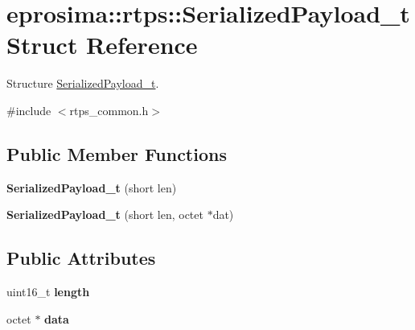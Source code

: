 \hypertarget{structeprosima_1_1rtps_1_1_serialized_payload__t}{\section{eprosima\-:\-:rtps\-:\-:\-Serialized\-Payload\-\_\-t \-Struct \-Reference}
\label{structeprosima_1_1rtps_1_1_serialized_payload__t}
}


\-Structure \hyperlink{structeprosima_1_1rtps_1_1_serialized_payload__t}{\-Serialized\-Payload\-\_\-t}.  




{\ttfamily \#include $<$rtps\-\_\-common.\-h$>$}

\subsection*{\-Public \-Member \-Functions}
\begin{DoxyCompactItemize}
\item 
\hypertarget{structeprosima_1_1rtps_1_1_serialized_payload__t_ae764cdef3036696a60136a3c415dc4d1}{{\bfseries \-Serialized\-Payload\-\_\-t} (short len)}\label{structeprosima_1_1rtps_1_1_serialized_payload__t_ae764cdef3036696a60136a3c415dc4d1}

\item 
\hypertarget{structeprosima_1_1rtps_1_1_serialized_payload__t_a59854fca9500a1aaf42189bdb972950c}{{\bfseries \-Serialized\-Payload\-\_\-t} (short len, octet $\ast$dat)}\label{structeprosima_1_1rtps_1_1_serialized_payload__t_a59854fca9500a1aaf42189bdb972950c}

\end{DoxyCompactItemize}
\subsection*{\-Public \-Attributes}
\begin{DoxyCompactItemize}
\item 
\hypertarget{structeprosima_1_1rtps_1_1_serialized_payload__t_acddf05ab5c3a538ecf352e28fd9ca1db}{uint16\-\_\-t {\bfseries length}}\label{structeprosima_1_1rtps_1_1_serialized_payload__t_acddf05ab5c3a538ecf352e28fd9ca1db}

\item 
\hypertarget{structeprosima_1_1rtps_1_1_serialized_payload__t_ad6a9f8aa8708587d140d0d493d6efff2}{octet $\ast$ {\bfseries data}}\label{structeprosima_1_1rtps_1_1_serialized_payload__t_ad6a9f8aa8708587d140d0d493d6efff2}

\end{DoxyCompactItemize}


